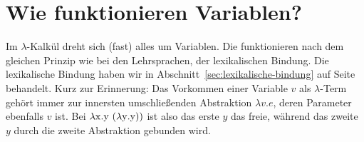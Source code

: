 \section{Wie funktionieren Variablen?}

Im $\lambda$-Kalkül dreht sich (fast) alles um Variablen.  Die
funktionieren nach dem gleichen Prinzip wie bei den Lehrsprachen, der
lexikalischen Bindung.  Die lexikalische Bindung haben wir in
Abschnitt~\ref{sec:lexikalische-bindung} auf
Seite~\pageref{sec:lexikalische-bindung} behandelt.  Kurz zur
Erinnerung:  Das
Vorkommen einer Variable $v$ als $\lambda$-Term gehört immer zur
innersten umschließenden Abstraktion $\lambda v.e$, deren Parameter
ebenfalls $v$ ist.  Bei $\lambda \mathrm x.\mathrm y~(\lambda \mathrm y.\mathrm y))$ 
ist also das erste $y$ das freie, während das zweite $y$ durch
die zweite Abstraktion gebunden wird.

